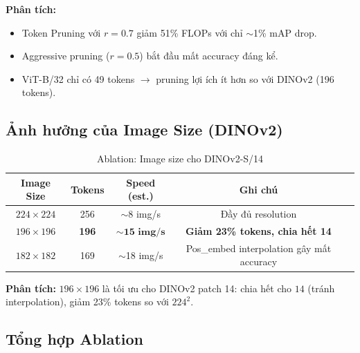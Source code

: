 \documentclass[13pt,a4paper]{article}
\begin{document}
\textbf{Phân tích:}
\begin{itemize}
    \item Token Pruning với $r = 0.7$ giảm 51\% FLOPs với chỉ $\sim$1\% mAP drop.
    \item Aggressive pruning ($r = 0.5$) bắt đầu mất accuracy đáng kể.
    \item ViT-B/32 chỉ có 49 tokens $\to$ pruning lợi ích ít hơn so với DINOv2 (196 tokens).
\end{itemize}


\subsection{Ảnh hưởng của Image Size (DINOv2)}

\begin{table}[H]
\centering
\caption{Ablation: Image size cho DINOv2-S/14}
\label{tab:ablation_imgsize}
\begin{tabular}{ccccl}
\toprule
\textbf{Image Size} & \textbf{Tokens} & \textbf{Speed (est.)} & \textbf{Ghi chú} \\
\midrule
$224\times224$ & 256 & $\sim$8 img/s   & Đầy đủ resolution \\
\textbf{$196\times196$} & \textbf{196} & $\textbf{$\sim$15 img/s}$ & \textbf{Giảm 23\% tokens, chia hết 14} \\
$182\times182$ & 169 & $\sim$18 img/s  & Pos\_embed interpolation gây mất accuracy \\
\bottomrule
\end{tabular}
\end{table}

\textbf{Phân tích:} $196\times196$ là tối ưu cho DINOv2 patch 14: chia hết cho $14$ (tránh interpolation), giảm 23\% tokens so với $224^2$.


\subsection{Tổng hợp Ablation}
\end{document}
